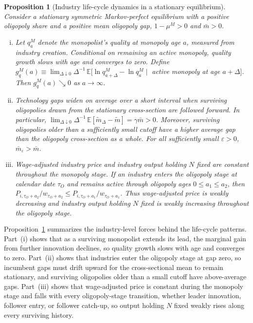 \documentclass[12pt]{article}
\newtheorem{proposition}{Proposition}[section]
\begin{document}
\begin{proposition}[Industry life-cycle dynamics in a stationary equilibrium]
\label{prop:lifecycle}
Consider a stationary symmetric Markov-perfect equilibrium with a positive oligopoly share and a positive mean oligopoly gap, \(1-\mu^M>0\) and \(\bar m>0\).

\begin{enumerate}[(i)]

\item Let \(q_a^M\) denote the monopolist's quality at monopoly age \(a\), measured from industry creation. Conditional on remaining an active monopoly, quality growth slows with age and converges to zero. Define \(g_q^M(a)\equiv\lim_{\Delta\downarrow0}\Delta^{-1}\,\mathbb E[\ln q^M_{a+\Delta}-\ln q^M_a\mid\) active monopoly at age \(a+\Delta]\). Then \(g_q^M(a)\searrow0\) as \(a\to\infty\).

\item Technology gaps widen on average over a short interval when surviving oligopolies drawn from the stationary cross-section are followed forward. In particular, \(\lim_{\Delta\downarrow0}\Delta^{-1}\,\mathbb E[\tilde m_\Delta-\tilde m]=\gamma\bar m>0\). Moreover, surviving oligopolies older than a sufficiently small cutoff have a higher average gap than the oligopoly cross-section as a whole. For all sufficiently small \(\varepsilon>0\), \(\bar m_\varepsilon>\bar m\).

\item Wage-adjusted industry price and industry output holding \(N\) fixed are constant throughout the monopoly stage. If an industry enters the oligopoly stage at calendar date \(\tau_O\) and remains active through oligopoly ages \(0\leq a_1\leq a_2\), then \(P_{i,\tau_O+a_2}/w_{\tau_O+a_2}\leq P_{i,\tau_O+a_1}/w_{\tau_O+a_1}\). Thus wage-adjusted price is weakly decreasing and industry output holding \(N\) fixed is weakly increasing throughout the oligopoly stage.

\end{enumerate}
\end{proposition}

Proposition~\ref{prop:lifecycle} summarizes the industry-level forces behind the life-cycle patterns. Part~(i) shows that as a surviving monopolist extends its lead, the marginal gain from further innovation declines, so quality growth slows with age and converges to zero. Part~(ii) shows that industries enter the oligopoly stage at gap zero, so incumbent gaps must drift upward for the cross-sectional mean to remain stationary, and surviving oligopolies older than a small cutoff have above-average gaps. Part~(iii) shows that wage-adjusted price is constant during the monopoly stage and falls with every oligopoly-stage transition, whether leader innovation, follower entry, or follower catch-up, so output holding \(N\) fixed weakly rises along every surviving history.
\end{document}
